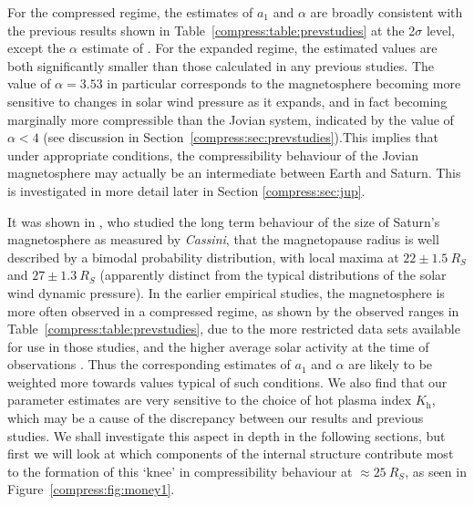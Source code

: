 For the compressed regime, the estimates of $a_1$ and $\alpha$ are broadly consistent with the previous results shown in Table~\ref{compress:table:prevstudies} at the 2$\sigma$ level, except the $\alpha$ estimate of \citet{pilkington2015}. For the expanded regime, the estimated values are both significantly smaller than those calculated in any previous studies. The value of $\alpha = 3.53$ in particular corresponds to the magnetosphere becoming more sensitive to changes in solar wind pressure as it expands, and in fact becoming marginally more compressible than the Jovian system, indicated by the value of $\alpha < 4$ (see discussion in Section~\ref{compress:sec:prevstudies}).This implies that under appropriate conditions, the compressibility behaviour of the Jovian magnetosphere may actually be an intermediate between Earth and Saturn. This is investigated in more detail later in Section \ref{compress:sec:jup}.

It was shown in \citet{achilleos2008}, who studied the long term behaviour of the size of Saturn's magnetosphere as measured by \textit{Cassini}, that the magnetopause radius is well described by a bimodal probability distribution, with local maxima at $22 \pm \SI{1.5}{R_S}$ and $27 \pm \SI{1.3}{R_S}$ (apparently distinct from the typical distributions of the solar wind dynamic pressure). In the earlier empirical studies, the magnetosphere is more often observed in a compressed regime, as shown by the observed ranges in Table~\ref{compress:table:prevstudies}, due to the more restricted data sets available for use in those studies, and the higher average solar activity at the time of observations \cite[e.g.][]{hathaway2015}. Thus the corresponding estimates of $a_1$ and $\alpha$ are likely to be weighted more towards values typical of such conditions. We also find that our parameter estimates are very sensitive to the choice of hot plasma index $K_\mathrm{h}$, which may be a cause of the discrepancy between our results and previous studies. We shall investigate this aspect in depth in the following sections, but first we will look at which components of the internal structure contribute most to the formation of this `knee' in compressibility behaviour at $\approx \SI{25}{R_S}$, as seen in Figure~\ref{compress:fig:money1}.

